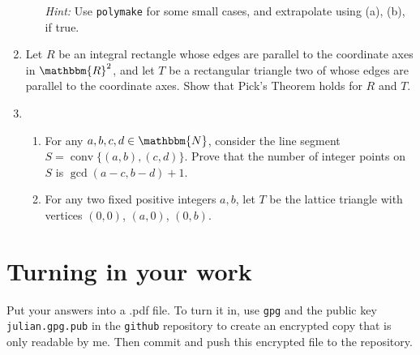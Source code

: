\documentclass[11pt]{amsart}
\newcommand{\N}{\mathbbm{N}}
\newcommand{\R}{\mathbbm{R}}
\DeclareMathOperator{\conv}{conv}
\DeclareMathOperator{\LL}{\mathsf{L}}
\DeclareMathOperator{\Ehr}{\mathsf{Ehr}}
\begin{document}
\begin{enumerate}
\begin{enumerate}

\emph{Hint:} Use \texttt{polymake} for some small cases, and extrapolate using (a), (b), if true.
\end{enumerate}

\item Let $R$ be an integral rectangle whose edges are parallel to the coordinate axes in $\R^2$, and let $T$ be a rectangular triangle two of whose edges are parallel to the coordinate axes. Show that Pick's Theorem holds for $R$ and $T$.

\item
  \begin{enumerate}
  \item For any $a,b,c,d\in\N$, consider the line segment $S=\conv\{(a,b),(c,d)\}$. Prove that the number of integer points on $S$ is $\gcd(a-c, b-d) + 1$.
  \item For any two fixed positive integers $a,b$, let $T$ be the lattice triangle with vertices $(0,0)$, $(a,0)$, $(0,b)$. 

  \end{enumerate}

\end{enumerate}




\bigskip
\section*{Turning in your work}

Put your answers into a .pdf file. To turn it in, use \texttt{gpg} and the public key \texttt{julian.gpg.pub} in the \texttt{github} repository to create an encrypted copy that is only readable by me. Then commit and push this encrypted file to the repository.
\end{document}
